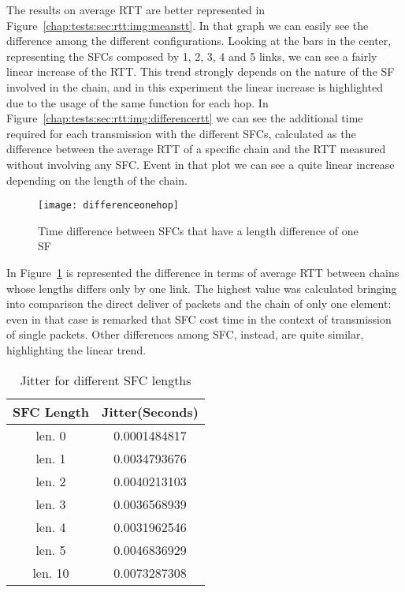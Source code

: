 The results on average RTT are better represented in
Figure~\ref{chap:tests:sec:rtt:img:meanstt}. In that graph we can easily see
the difference among the different configurations. Looking at the bars in the
center, representing the SFCs composed by 1, 2, 3, 4 and 5 links, we can see a
fairly linear increase of the RTT. This trend strongly depends on the nature of
the SF involved in the chain, and in this experiment the linear increase is
highlighted due to the usage of the same function for each hop. In
Figure~\ref{chap:tests:sec:rtt:img:differencertt} we can see the additional
time required for each transmission with the different SFCs, calculated as the
difference between the average RTT of a specific chain and the RTT measured
without involving any SFC. Event in that plot we can see a quite linear
increase depending on the length of the chain.

\begin{figure}[H]
  \centering
  \texttt{[image: differenceonehop]}
  \caption{Time difference between SFCs that have a length difference of one SF}
  \label{chap:tests:sec:rtt:img:differenceonehop}
\end{figure}

In Figure~\ref{chap:tests:sec:rtt:img:differenceonehop} is represented the
difference in terms of average RTT between chains whose lengths differs only by
one link. The highest value was calculated bringing into comparison the direct
deliver of packets and the chain of only one element: even in that case is
remarked that SFC cost time in the context of transmission of single packets.
Other differences among SFC, instead, are quite similar, highlighting the
linear trend.

\begin{table}[H]
\centering
\begin{tabular}{@{}cc@{}}
\toprule
\textbf{SFC Length} & \textbf{Jitter(Seconds)} \\ \midrule
len. 0    & 0.0001484817    \\
len. 1    & 0.0034793676    \\
len. 2    & 0.0040213103    \\
len. 3    & 0.0036568939    \\
len. 4    & 0.0031962546    \\
len. 5    & 0.0046836929    \\
len. 10   & 0.0073287308    \\ \bottomrule
\end{tabular}
\caption{Jitter for different SFC lengths}
\label{chap:tests:sec:rtt:tab:jitter}
\end{table}

